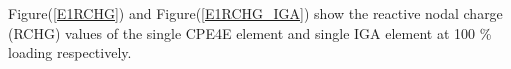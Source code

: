 \documentclass[11pt]{article}
\begin{document}

Figure(\ref{E1RCHG}) and Figure(\ref{E1RCHG_IGA}) show the reactive nodal charge (RCHG) values of the single CPE4E element and single IGA element at 100 \% loading respectively. \\
\end{document}
